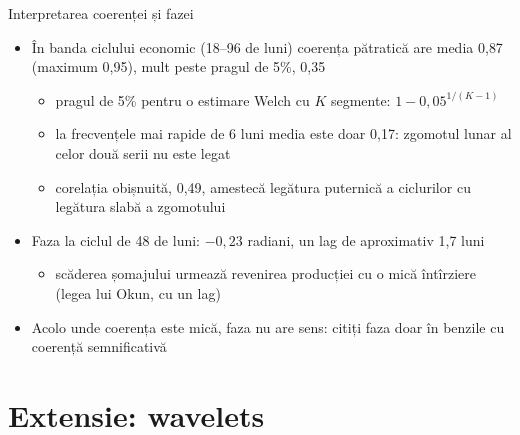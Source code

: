 \begin{frame}{Interpretarea coerenței și fazei}
\itemsize{\small}
\begin{itemize}
    \item În banda ciclului economic (18--96 de luni) coerența pătratică are media 0{,}87 (maximum 0{,}95), mult peste pragul de 5\%, 0{,}35
    \begin{itemize}
        \item pragul de 5\% pentru o estimare Welch cu $K$ segmente: $1 - 0{,}05^{1/(K-1)}$
        \item la frecvențele mai rapide de 6 luni media este doar 0{,}17: zgomotul lunar al celor două serii nu este legat
        \item corelația obișnuită, 0{,}49, amestecă legătura puternică a ciclurilor cu legătura slabă a zgomotului
    \end{itemize}
    \item Faza la ciclul de 48 de luni: $-0{,}23$ radiani, un lag de aproximativ 1{,}7 luni
    \begin{itemize}
        \item scăderea șomajului urmează revenirea producției cu o mică întîrziere (legea lui Okun, cu un lag)
    \end{itemize}
    \item Acolo unde coerența este mică, faza nu are sens: citiți faza doar în benzile cu coerență semnificativă
\end{itemize}
\end{frame}


\section{Extensie: wavelets}

